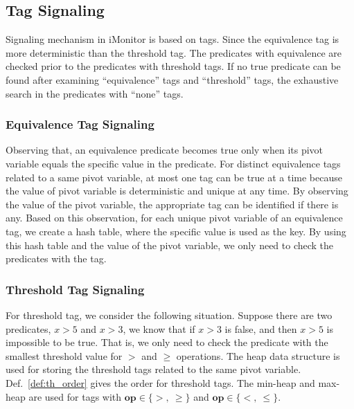 \documentclass[preprint]{sigplanconf}
\begin{document}
\subsection{Tag Signaling}
Signaling mechanism in iMonitor is based on tags. 
Since the equivalence tag is more deterministic than the threshold tag. The
predicates with equivalence are checked prior to the predicates with threshold
tags. If no true predicate can be found after examining ``equivalence'' tags and
``threshold'' tags, the exhaustive search in the predicates with ``none'' tags. 

\subsubsection{Equivalence Tag Signaling}
Observing that, an equivalence predicate becomes true only when its pivot 
variable equals the specific value in the predicate. For distinct equivalence 
tags related to a same pivot variable, at most one tag can be true at a time 
because the value of pivot variable is deterministic and unique at any time. By 
observing the value of the pivot variable, the appropriate tag can be 
identified if there is any. Based on this 
observation, for each unique pivot variable of an equivalence tag, we create a 
hash table, where the specific value is used as the key. By using this hash 
table and the value of the pivot variable, we only need to check the predicates 
with the tag. 


\subsubsection{Threshold Tag Signaling}
For threshold tag, we consider the following situation. Suppose there are two 
predicates, $x > 5$ and $x > 3$, we know that if $x > 3$ is false, and then $x > 5$ 
is impossible to be true. That is, we only need to check the predicate with the 
smallest threshold value for $>$ and $\ge$ operations. The heap data structure
is used for storing the threshold tags related to the same pivot variable. 
Def.~\ref{def:th_order} gives the order for threshold tags. The min-heap and
max-heap are used for tags with $\boldsymbol{op} \in \{>,\ \ge\}$ and
$\boldsymbol{op} \in \{<,\ \le\}$. 
\end{document}
